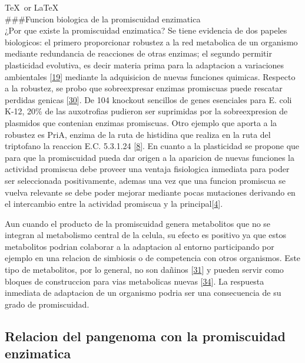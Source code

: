 \documentclass[12pt,twoside]{reedthesis}
\begin{document}
  \TeX~or \LaTeX~\\
  \#\#\#Funcion biologica de la promiscuidad enzimatica\\
  ¿Por que existe la promiscuidad enzimatica? Se tiene evidencia de dos
  papeles biologicos: el primero proporcionar robustez a la red metabolica
  de un organismo mediante redundancia de reacciones de otras enzimas; el
  segundo permitir plasticidad evolutiva, es decir materia prima para la
  adaptacion a variaciones ambientales
  {[}\protect\hyperlink{ref-aharoniux5fevolvabilityux5f2005}{19}{]}
  mediante la adquisicion de nuevas funciones quimicas. Respecto a la
  robustez, se probo que sobreexpresar enzimas promiscuas puede rescatar
  perdidas genicas
  {[}\protect\hyperlink{ref-patrickux5fmulticopyux5f2007}{30}{]}. De 104
  knockout sencillos de genes esenciales para E. coli K-12, 20\% de las
  auxotrofias pudieron ser suprimidas por la sobreexpresion de plasmidos
  que contenian enzimas promiscuas. Otro ejemplo que aporta a la robustez
  es PriA, enzima de la ruta de histidina que realiza en la ruta del
  triptofano la reaccion E.C. 5.3.1.24
  {[}\protect\hyperlink{ref-baronagomezux5foccurrenceux5f2003}{8}{]}. En
  cuanto a la plasticidad se propone que para que la promiscuidad pueda
  dar origen a la aparicion de nuevas funciones la actividad promiscua
  debe proveer una ventaja fisiologica inmediata para poder ser
  seleccionada positivamente, ademas una vez que una funcion promiscua se
  vuelva relevante se debe poder mejorar mediante pocas mutaciones
  derivando en el intercambio entre la actividad promiscua y la
  principal{[}\protect\hyperlink{ref-khersonskyux5fenzymeux5f2010}{4}{]}.
  
  Aun cuando el producto de la promiscuidad genera metabolitos que no se
  integran al metabolismo central de la celula, su efecto es positivo ya
  que estos metabolitos podrian colaborar a la adaptacion al entorno
  participando por ejemplo en una relacion de simbiosis o de competencia
  con otros organismos. Este tipo de metabolitos, por lo general, no son
  dañinos
  {[}\protect\hyperlink{ref-notebaartux5fnetwork-levelux5f2014}{31}{]} y
  pueden servir como bloques de construccion para vias metabolicas nuevas
  {[}\protect\hyperlink{ref-maux5funconventionalux5f2013}{34}{]}. La
  respuesta inmediata de adaptacion de un organismo podria ser una
  consecuencia de su grado de promiscuidad.
  
  \subsection{Relacion del pangenoma con la promiscuidad
  enzimatica}\label{relacion-del-pangenoma-con-la-promiscuidad-enzimatica}
  
\end{document}

